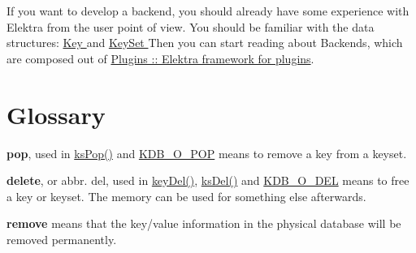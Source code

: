 If you want to develop a backend, you should already have some experience with Elektra from the user point of view. You should be familiar with the data structures: \hyperlink{group__key}{Key } and \hyperlink{group__keyset}{KeySet } Then you can start reading about Backends, which are composed out of \hyperlink{group__plugin}{Plugins :: Elektra framework for plugins}.\hypertarget{index_glossary}{}\section{Glossary}\label{index_glossary}

\begin{DoxyItemize}
\item {\bfseries pop}, used in \hyperlink{group__keyset_gae42530b04defb772059de0600159cf69}{ksPop()} and \hyperlink{group__keyset_KDB_O_POP}{KDB\_\-O\_\-POP} means to remove a key from a keyset.
\item {\bfseries delete}, or abbr. del, used in \hyperlink{group__key_ga3df95bbc2494e3e6703ece5639be5bb1}{keyDel()}, \hyperlink{group__keyset_ga27e5c16473b02a422238c8d970db7ac8}{ksDel()} and \hyperlink{group__kdb_gga98a3d6a4016c9dad9cbd1a99a9c2a45aa66a5380c120f25f28f49848c4a863ead}{KDB\_\-O\_\-DEL} means to free a key or keyset. The memory can be used for something else afterwards.
\item {\bfseries remove} means that the key/value information in the physical database will be removed permanently. 
\end{DoxyItemize}